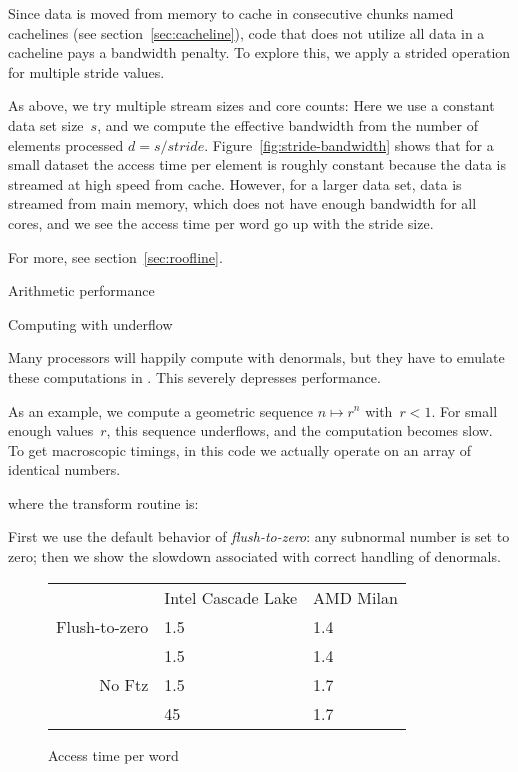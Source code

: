 Since data is moved from memory to cache in consecutive chunks named
cachelines (see section~\ref{sec:cacheline}), code that does not
utilize all data in a cacheline pays a bandwidth penalty.
To explore this, we apply a strided operation
%
%
for multiple stride values.

As above, we try multiple stream sizes and core counts:
%
%
Here we use a constant data set size~$s$, and we compute the effective bandwidth
from the number of elements processed $d=s/\mathit{stride}$.
Figure~\ref{fig:stride-bandwidth} shows that for a small dataset
the access time per element is roughly constant
because the data is streamed at high speed from cache.
However, for a larger data set, data is streamed from main memory,
which does not have enough bandwidth for all cores,
and we see the access time per word go up with the stride size.


For more, see section~\ref{sec:roofline}.

 {Arithmetic performance}


 {Computing with underflow}
\label{sec:subcompute}

Many processors will happily compute with denormals,
but they have to emulate these computations in .
This severely depresses performance.

As an example, we compute a geometric sequence $n\mapsto r^n$ with~$r<1$.
For small enough values~$r$, this sequence underflows, and the computation becomes slow.
To get macroscopic timings, in this code we actually operate on an array
of identical numbers.


where the transform routine is:


First we use the default behavior of
\emph{flush-to-zero}:
any subnormal number is set to zero;
then we show the slowdown associated with correct handling
of denormals.

\begin{figure}
  \begin{tabular}{rp{.6in}p{.6in}}
                 &Intel Cascade Lake&AMD Milan\\
    Flush-to-zero&1.5               &1.4\\
                 &1.5               &1.4\\
    No Ftz       &1.5               &1.7\\
                 &45                &1.7\\
  \end{tabular}
  \caption{Access time per word}
  \label{fig:perf-underflow}
\end{figure}

